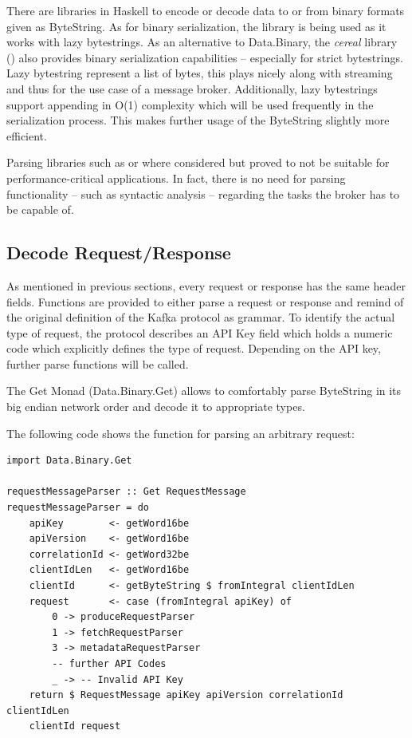 There are libraries in Haskell to encode or decode data to or from binary
formats given as ByteString. As for binary serialization, the
library is being used as it works with lazy bytestrings. As an alternative to
Data.Binary, the \textit{cereal} library
()
also provides binary serialization capabilities -- especially for strict
bytestrings. Lazy bytestring represent a list of bytes, this plays nicely along
with streaming and thus for the use case of a message broker. Additionally,
lazy bytestrings support appending in O(1) complexity which will be used
frequently in the serialization process. This makes further usage of the
ByteString slightly more efficient.

Parsing libraries such as
 or
 where considered but
proved to not be suitable for performance-critical applications. In fact, there
is no need for parsing functionality -- such as syntactic analysis -- regarding
the tasks the broker has to be capable of. 

\subsection{Decode Request/Response}

As mentioned in previous sections, every request or response has the same header
fields. Functions are provided to either parse a request or response and
remind of the original definition of the Kafka protocol as grammar. To identify
the actual type of request, the protocol describes an API Key field which holds
a numeric code which explicitly defines the type of request. Depending on the
API key, further parse functions will be called. 

The Get Monad (Data.Binary.Get) allows to comfortably parse ByteString in
its big endian network order and decode it to appropriate types.

The following code shows the function for parsing an arbitrary request:

\begin{lstlisting}[caption={Decode of RequestMessage, depending on ApiKey}]
import Data.Binary.Get

requestMessageParser :: Get RequestMessage 
requestMessageParser = do 
    apiKey        <- getWord16be
    apiVersion    <- getWord16be
    correlationId <- getWord32be
    clientIdLen   <- getWord16be
    clientId      <- getByteString $ fromIntegral clientIdLen
    request       <- case (fromIntegral apiKey) of
        0 -> produceRequestParser
        1 -> fetchRequestParser
        3 -> metadataRequestParser
        -- further API Codes 
        _ -> -- Invalid API Key 
    return $ RequestMessage apiKey apiVersion correlationId clientIdLen
    clientId request
\end{lstlisting}

